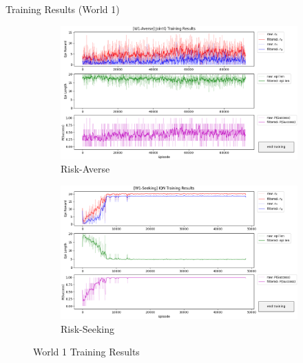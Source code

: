 \documentclass[aspectratio=1610, xcolor=dvipsnames]{packages/beamer}
\begin{document}
\begin{frame}{Training Results (World 1)}
     \begin{figure}
     \centering
         \begin{subfigure}[b]{\Wfig\textwidth} \centering
             \includegraphics[width=\textwidth]{../results/IDQN_W1/Fig_W1_JointQ_Averse}
             \caption{Risk-Averse} \label{fig:W1averse}
         \end{subfigure}
         \hfill
         \begin{subfigure}[b]{\Wfig\textwidth} \centering
             \includegraphics[width=\textwidth]{../results/IDQN_W1/Fig_W1_JointQ_Seeking}
             \caption{Risk-Seeking} \label{fig:W1seeking}
         \end{subfigure}
    \caption{World 1 Training Results}
    \label{fig:W1}
    \end{figure}
\end{frame}
\end{document}
